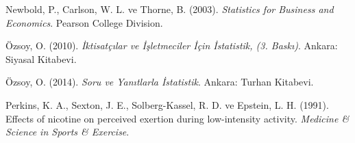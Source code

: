 \documentclass[
  12pt,
]{article}
\newlength{\cslhangindent}
\newlength{\cslentryspacingunit} %
\newenvironment{CSLReferences}[2] %
 {%
  \setlength{\parindent}{0pt}
  \ifodd #1
  \let\oldpar\par
  \def\par{\hangindent=\cslhangindent\oldpar}
  \fi
  \setlength{\parskip}{#2\cslentryspacingunit}
 }%
 {}
\begin{document}
\hypertarget{refs}{}
\begin{CSLReferences}{1}{0}
\leavevmode{}%
Newbold, P., Carlson, W. L. ve Thorne, B. (2003). \emph{Statistics for Business and Economics}. Pearson College Division.

\leavevmode{}%
Özsoy, O. (2010). \emph{İktisat{ç}{ı}lar ve İ{ş}letmeciler İ{ç}in İstatistik, (3. Bask{ı})}. Ankara: Siyasal Kitabevi.

\leavevmode{}%
Özsoy, O. (2014). \emph{Soru ve Yanıtlarla İstatistik}. Ankara: Turhan Kitabevi.

\leavevmode{}%
Perkins, K. A., Sexton, J. E., Solberg-Kassel, R. D. ve Epstein, L. H. (1991). Effects of nicotine on perceived exertion during low-intensity activity. \emph{Medicine \& Science in Sports \& Exercise}.

\end{CSLReferences}
\end{document}
